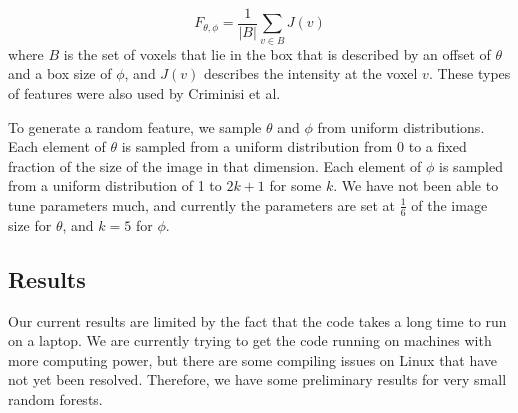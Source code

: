 \begin{equation}
  F_{\theta, \phi} = \frac{1}{|B|} \sum_{v \in B} J(v)
\end{equation}
where $B$ is the set of voxels that lie in the box that is described by an offset of $\theta$ and a box size of $\phi$, and $J(v)$ describes the intensity at the voxel $v$. These types of features were also used by Criminisi et al.

To generate a random feature, we sample $\theta$ and $\phi$ from uniform distributions. Each element of $\theta$ is sampled from a uniform distribution from 0 to a fixed fraction of the size of the image in that dimension. Each element of $\phi$ is sampled from a uniform distribution of 1 to $2k+1$ for some $k$. We have not been able to tune parameters much, and currently the parameters are set at $\frac{1}{6}$ of the image size for $\theta$, and $k = 5$ for $\phi$. 

\subsection{Results}
Our current results are limited by the fact that the code takes a long time to run on a laptop. We are currently trying to get the code running on machines with more computing power, but there are some compiling issues on Linux that have not yet been resolved. Therefore, we have some preliminary results for very small random forests.


